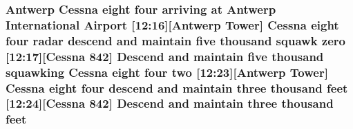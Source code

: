 \subsubsection[{\texorpdfstring{feet}{feet}}]{\setlength{\rightskip}{0pt plus 5cm}Antwerp {\bf Cessna} eight four arriving at Antwerp International {\bf Airport} \mbox{[}12\+:16\mbox{]}\mbox{[}Antwerp {\bf Tower}\mbox{]} {\bf Cessna} eight four radar descend and maintain five {\bf thousand} squawk {\bf zero} \mbox{[}12\+:17\mbox{]}\mbox{[}{\bf Cessna} 842\mbox{]} Descend and maintain five {\bf thousand} {\bf squawking} {\bf Cessna} eight four {\bf two} \mbox{[}12\+:23\mbox{]}\mbox{[}Antwerp {\bf Tower}\mbox{]} {\bf Cessna} eight four descend and maintain three {\bf thousand} feet \mbox{[}12\+:24\mbox{]}\mbox{[}{\bf Cessna} 842\mbox{]} Descend and maintain three {\bf thousand} feet}\hypertarget{happyDay3ATC_8txt_adb5a296986a5b6019ec88f520f243c26}{}\label{happyDay3ATC_8txt_adb5a296986a5b6019ec88f520f243c26}
